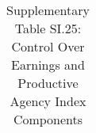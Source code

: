 \begin{longtable}{llcccccccccc}
\caption{Supplementary Table SI.25: Control Over Earnings and Productive Agency Index Components} \label{tab:pap__b10_5} \\                                                                                                                                                                                                                                                                                                                                                                                                                                                                                                                                                                                                                                                                                                                                                               
\hline \hline                                                                                                                                                                                                                                                                                                                                                                                                                                                                                                                                                                                                                                                                                                                                                                                                                                                                             

\end{longtable}
